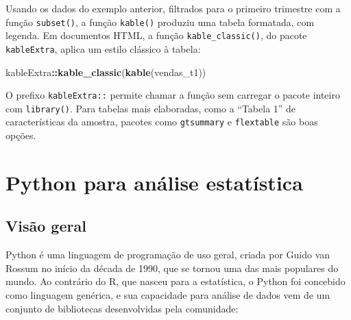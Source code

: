 \documentclass[
]{book}
\newenvironment{Shaded}{\begin{snugshade}}{\end{snugshade}}
\newcommand{\FunctionTok}[1]{\textcolor[rgb]{0.13,0.29,0.53}{\textbf{#1}}}
\newcommand{\NormalTok}[1]{#1}
\newcommand{\SpecialCharTok}[1]{\textcolor[rgb]{0.81,0.36,0.00}{\textbf{#1}}}
\begin{document}
Usando os dados do exemplo anterior, filtrados para o primeiro trimestre com a função \texttt{subset()}, a função \texttt{kable()} produziu uma tabela formatada, com legenda. Em documentos HTML, a função \texttt{kable\_classic()}, do pacote \texttt{kableExtra}, aplica um estilo clássico à tabela:

\begin{Shaded}
\begin{Highlighting}[]
\NormalTok{kableExtra}\SpecialCharTok{::}\FunctionTok{kable\_classic}\NormalTok{(}\FunctionTok{kable}\NormalTok{(vendas\_t1))}
\end{Highlighting}
\end{Shaded}

O prefixo \texttt{kableExtra::} permite chamar a função sem carregar o pacote inteiro com \texttt{library()}. Para tabelas mais elaboradas, como a ``Tabela 1'' de características da amostra, pacotes como \texttt{gtsummary} e \texttt{flextable} são boas opções.

\section{Python para análise estatística}\label{python-para-anuxe1lise-estatuxedstica}

\subsection{Visão geral}\label{visuxe3o-geral}

Python é uma linguagem de programação de uso geral, criada por Guido van Rossum no início da década de 1990, que se tornou uma das mais populares do mundo. Ao contrário do R, que nasceu para a estatística, o Python foi concebido como linguagem genérica, e sua capacidade para análise de dados vem de um conjunto de bibliotecas desenvolvidas pela comunidade:
\end{document}
